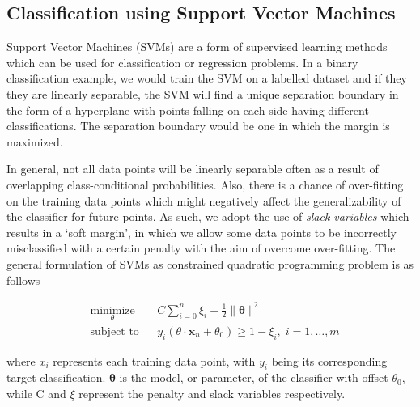 \documentclass[12pt]{article}
\begin{document}
	\subsection{Classification using Support Vector Machines}	
	\label{subsection:svm}
	Support Vector Machines (SVMs) are a form of supervised learning methods which can be used for classification or regression problems. In a binary classification example, we would train the SVM on a labelled dataset and if they they are linearly separable, the SVM will find a unique separation boundary in the form of a hyperplane with points falling on each side having different classifications. The separation boundary would be one in which the margin is maximized. 

	In general, not all data points will be linearly separable often as a result of overlapping class-conditional probabilities. Also, there is a chance of over-fitting on the training data points which might negatively affect the generalizability of the classifier for future points. As such, we adopt the use of \textit{slack variables} which results in a `soft margin', in which we allow some data points to be incorrectly misclassified with a certain penalty with the aim of overcome over-fitting. The general formulation of SVMs as constrained quadratic programming problem is as follows

	\begin{equation*}
	\label{equation:svm}
	\begin{aligned}
	& \underset{\theta}{\text{minimize}}
	& & C\sum_{i=0}^n\xi_{i} + \frac{1}{2} \parallel\mathbf{\theta}\parallel^{2}  \\
	& \text{subject to}
	& & y_{i}(\theta\cdot\mathbf{x}_{n}+\theta_{0}) \ge 1 - \xi_{i}, \; i = 1, \ldots, m
	\end{aligned}
	\end{equation*}

	where $x_{i}$ represents each training data point, with $y_{i}$ being its corresponding target classification. $\mathbf{\theta}$ is the model, or parameter, of the classifier with offset $\theta_{0}$, while C and $\xi$ represent the penalty and slack variables respectively.
	
\end{document}
